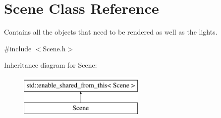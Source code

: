 \hypertarget{class_scene}{}\section{Scene Class Reference}
\label{class_scene}


Contains all the objects that need to be rendered as well as the lights.  




{\ttfamily \#include $<$Scene.\+h$>$}

Inheritance diagram for Scene\+:\begin{figure}[H]
\begin{center}
\leavevmode
\includegraphics[height=2.000000cm]{class_scene}
\end{center}
\end{figure}
